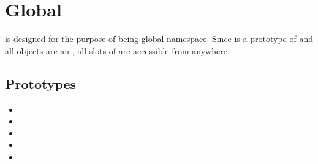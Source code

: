 \section{Global}

 is designed for the purpose of being global
namespace. Since  is a prototype of  and all
objects are an , all slots of  are accessible from
anywhere.

\subsection{Prototypes}
\begin{itemize}
\item {}
\item {}
\item {}
\item {}
\item {}
\end{itemize}

